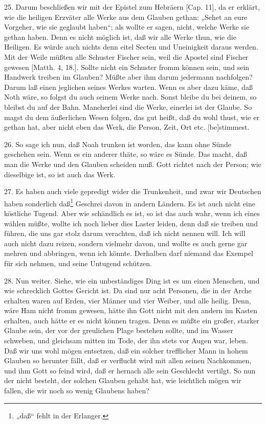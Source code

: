 25. Darum beschließen wir mit der Epistel zum Hebräern [Cap. 11], da er erklärt, wie die heiligen Erzväter alle Werke aus dem Glauben gethan: „Sehet an eure Vorgeher, wie sie geglaubt haben“; als wollte er sagen, nicht, welche Werke sie gethan haben. Denn es nicht möglich ist, daß wir alle Werke thun, wie die Heiligen. Es würde auch nichts denn eitel Secten und Uneinigkeit daraus werden. Mit der Weile müßten alle Schuster Fischer sein, weil die Apostel sind Fischer gewesen [Matth. 4, 18.]. Sollte nicht ein Schuster fromm können sein, und sein Handwerk treiben im Glauben? Müßte aber ihm darum jedermann nachfolgen? Darum laß einen jeglichen seines Werkes warten. Wenn es aber dazu käme, daß Noth wäre, so folgst du auch seinem Werke nach. Sonst bleibe du bei deinem, so bleibst du auf der Bahn. Mancherlei sind die Werke, einerlei ist der Glaube. So magst du dem äußerlichen Wesen folgen, das gut heißt, daß du wohl thust, wie er gethan hat, aber nicht eben das Werk, die Person, Zeit, Ort etc. [be]stimmest.

26. So sage ich nun, daß Noah trunken ist worden, das kann ohne Sünde geschehen sein. Wenn es ein anderer thäte, so wäre es Sünde. Das macht, daß man die Werke und den Glauben scheiden muß. Gott richtet nach der Person; wie dieselbige ist, so ist auch das Werk.

27. Es haben auch viele gepredigt wider die
Trunkenheit, und zwar wir Deutschen haben sonderlich daß\footnote{„daß“ fehlt in der Erlanger.} Geschrei davon in andern Ländern. Es ist auch nicht eine köstliche Tugend. Aber wie schändlich es ist, so ist das auch wahr, wenn ich eines wählen müßte, wollte ich noch lieber dies Laster leiden, denn daß sie treiben und führen, die uns gar stolz darum verachten, daß ich nicht nennen will. Ich will auch nicht dazu reizen, sondern vielmehr davon, und wollte es auch gerne gar mehren und abbringen, wenn ich könnte. Derhalben darf niemand das Exempel für sich nehmen, und seine Untugend schützen.

28. Nun weiter. Siehe, wie ein unbeständiges Ding ist es um einen Menschen, und wie schrecklich Gottes Gericht ist. Da sind nur acht Personen, die in der Arche erhalten waren auf Erden, vier Männer und vier Weiber, und alle heilig. Denn, wäre Ham nicht fromm gewesen, hätte ihn Gott nicht mit den andern im Kasten erhalten, auch hätte er es nicht können tragen. Denn es müßte ein großer, starker Glaube sein, der vor der greulichen Plage bestehen sollte, und im Wasser schweben, und gleichsam mitten im Tode, der ihn stets vor Augen war, leben. Daß wir uns wohl mögen entsetzen, daß ein solcher trefflicher Mann in hohem Glauben so herunter fällt, daß er verflucht wird mit allen seinen Nachkommen, und ihm Gott so feind wird, daß er hernach alle sein Geschlecht vertilgt. So nun der nicht besteht, der solchen Glauben gehabt hat, wie leichtlich mögen wir fallen, die wir noch so wenig Glaubens haben?

